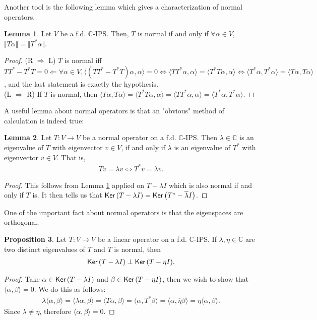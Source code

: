 \documentclass[letterpaper,11pt,twoside]{article}
\theoremstyle{definition}
\newtheorem{proposition}{Proposition}[subsection]
\theoremstyle{definition}
\theoremstyle{definition}
\theoremstyle{definition}
\newtheorem{lemma}[proposition]{\textbf{Lemma}}
\theoremstyle{definition}
\theoremstyle{definition}
\theoremstyle{remark}
\theoremstyle{definition}
\newcommand{\Ker}[1]{{\fontfamily{lmss}\selectfont 
		\text{Ker}\left (#1\right )
}}
\newcommand{\ip}[2]{\langle #1,#2 \rangle}
\newcommand{\norm}[1]{\Vert #1 \Vert}
\newcommand{\conj}[1]{\overline{#1}}
\newcommand{\C}{\mathbb{C}}
\begin{document}
	Another tool is the following lemma which gives a characterization of normal operators.
	\begin{lemma}\label{L-4.2.10}
		Let $ V $ be a f.d. $ \C $-IPS. Then, $ T $ is normal if and only if $ \forall \alpha \in V $, $ \norm{T\alpha} = \norm{T^{*}\alpha} $.
	\end{lemma}
	\begin{proof}
		(R $ \Rightarrow $ L) $ T $ is normal iff $ TT^{*}-T^{*}T =0 \Leftarrow \forall \alpha \in V, \ip{(TT^{*}-T^{*}T)\alpha}{\alpha} = 0 \iff \ip{TT^{*}\alpha}{\alpha} = \ip{T^{*}T\alpha}{\alpha} \iff \ip{T^{*}\alpha}{T^{*}\alpha} = \ip{T\alpha}{T\alpha}$, and the last statement is exactly the hypothesis.\\
		(L $ \Rightarrow $ R) If $ T $ is normal, then $ \ip{T\alpha}{T\alpha} = \ip{T^{*}T\alpha}{\alpha} = \ip{TT^{*}\alpha}{\alpha} = \ip{T^{*}\alpha}{T^{*}\alpha} $. 
	\end{proof}
	A useful lemma about normal operators is that an "obvious" method of calculation is indeed true:
	\begin{lemma}\label{L-4.3.5}
		Let $ T : V\to V $ be a normal operator on a f.d. $\C  $-IPS. Then $ \lambda\in \C $ is an eigenvalue of $ T $ with eigenvector $ v\in V $, if and only if $ \conj{\lambda} $ is an eigenvalue of $ T^{*} $ with eigenvector $ v \in  V$. That is,
		\begin{align*}
			Tv=\lambda v \iff T^{*}v = \conj{\lambda}v.
		\end{align*}
	\end{lemma}
	\begin{proof}
		This follows from Lemma \ref{L-4.2.10} applied on $ T-\lambda I $ which is also normal if and only if $ T $ is. It then tells us that $ \Ker{T-\lambda I} = \Ker{T^{*}-\conj{\lambda}I}$.
	\end{proof}
	One of the important fact about normal operators is that the eigenspaces are orthogonal.
	\begin{proposition}\label{P-4.3.5}
		Let $ T: V\to V $ be a linear operator on a f.d. $ \C $-IPS. If $ \lambda,\eta \in \C $ are two distinct eigenvalues of $ T $ and $ T $ is normal, then 
		\begin{align*}
			\Ker{T-\lambda I} \perp \Ker{T-\eta I}.
		\end{align*}
	\end{proposition}
\begin{proof}
		Take $ \alpha \in \Ker{T-\lambda I} $ and $ \beta \in \Ker{T-\eta I} $, then we wish to show that $ \ip{\alpha}{\beta} = 0 $. We do this as follows:
		\begin{align*}
			\lambda \ip{\alpha}{\beta} = \ip{\lambda \alpha}{\beta} 
									   = \ip{T\alpha}{\beta}
									   = \ip{\alpha}{T^{*}\beta}
									   = \ip{\alpha}{\conj{\eta}\beta}
									   = \eta\ip{\alpha}{\beta}.
		\end{align*}
		Since $ \lambda \neq \eta $, therefore $ \ip{\alpha}{\beta} = 0 $.
\end{proof}
	
\end{document}
